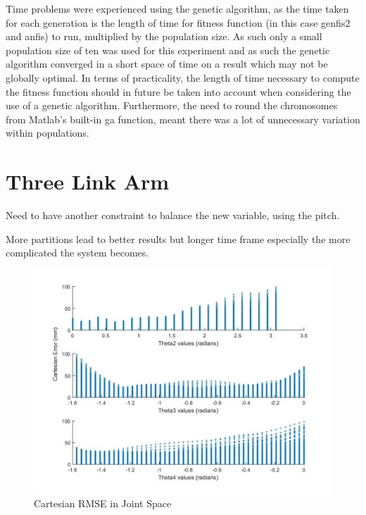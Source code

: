 \documentclass[11.5pt, twoside, a4paper]{article}
\begin{document}
Time problems were experienced using the genetic algorithm, as the time taken for each generation is the length of time for fitness function (in this case genfis2 and anfis) to run, multiplied by the population size. As such only a small population size of ten was used for this experiment and as such the genetic algorithm converged in a short space of time on a result which may not be globally optimal. In terms of practicality, the length of time necessary to compute the fitness function should in future be taken into account when considering the use of a genetic algorithm. Furthermore, the need to round the chromosomes from Matlab's built-in ga function, meant there was a lot of unnecessary variation within populations.

\section{Three Link Arm}

Need to have another constraint to balance the new variable, using the pitch.

More partitions lead to better results but longer time frame especially the more complicated the system becomes.

\begin{figure}
\includegraphics[width=\linewidth]{cartesianerrorsTHETA.jpg}
\caption{Cartesian RMSE in Joint Space\label{fig:carterrors}}
\end{figure}
\end{document}
